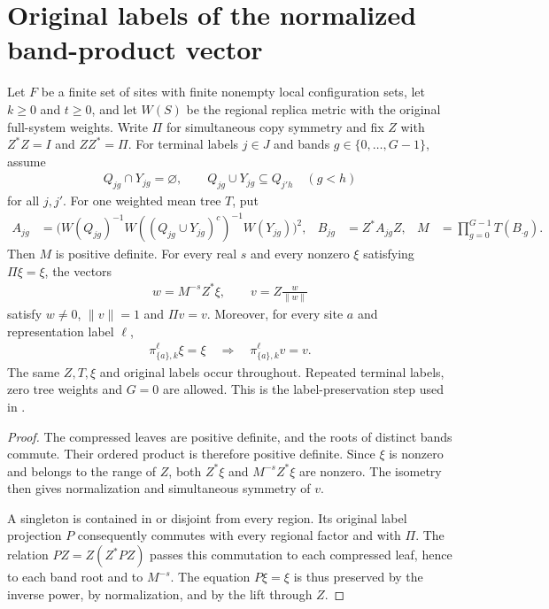 \section{Original labels of the normalized band-product vector}
\label{sec:replica_symmetric_band_label_preservation}

\begin{theorem}
\label{thm:replica_symmetric_band_label_preservation}
\leanok
Let $F$ be a finite set of sites with finite nonempty local configuration
sets, let $k\ge0$ and $t\ge0$, and let $W(S)$ be the regional replica
metric with the original full-system weights. Write $\Pi$ for simultaneous
copy symmetry and fix $Z$ with $Z^*Z=I$ and $ZZ^*=\Pi$.
For terminal labels $j\in J$ and bands $g\in\{0,\ldots,G-1\}$, assume
\begin{align*}
 Q_{jg}\cap Y_{jg}=\varnothing,\qquad
 Q_{jg}\cup Y_{jg}\subseteq Q_{j'h}\quad(g<h)
\end{align*}
for all $j,j'$. For one weighted mean tree $T$, put
\begin{align*}
 A_{jg}&=\bigl(W(Q_{jg})^{-1}W((Q_{jg}\cup Y_{jg})^c)^{-1}W(Y_{jg})\bigr)^2,
 &B_{jg}&=Z^*A_{jg}Z,
 &M&=\prod_{g=0}^{G-1}T(B_{\cdot g}).
\end{align*}
Then $M$ is positive definite. For every real $s$ and every nonzero
$\xi$ satisfying $\Pi\xi=\xi$, the vectors
\begin{align*}
 w=M^{-s}Z^*\xi,\qquad v=Z\frac{w}{\lVert w\rVert}
\end{align*}
satisfy $w\ne0$, $\lVert v\rVert=1$ and $\Pi v=v$.
Moreover, for every site $a$ and representation label $\ell$,
\begin{align*}
 \pi_{\{a\},k}^{\ell}\xi=\xi
 \quad\Longrightarrow\quad
 \pi_{\{a\},k}^{\ell}v=v.
\end{align*}
The same $Z,T,\xi$ and original labels occur throughout. Repeated
terminal labels, zero tree weights and $G=0$ are allowed.
This is the label-preservation step used in
\cite[Section~5, lines~101--103; Section~6, lines~388--401;
Section~7, lines~421--443]{OpenAI2026AreaLaw}.
\end{theorem}
\begin{proof}
\leanok
{}
The compressed leaves are positive definite, and the roots of distinct
bands commute. Their ordered product is therefore positive definite.
Since $\xi$ is nonzero and belongs to the range of $Z$, both $Z^*\xi$
and $M^{-s}Z^*\xi$ are nonzero. The isometry then gives normalization
and simultaneous symmetry of $v$.

A singleton is contained in or disjoint from every region. Its original
label projection $P$ consequently commutes with every regional factor
and with $\Pi$. The relation $PZ=Z(Z^*PZ)$ passes this commutation to
each compressed leaf, hence to each band root and to $M^{-s}$.
The equation $P\xi=\xi$ is thus preserved by the inverse power, by
normalization, and by the lift through $Z$.
\end{proof}
